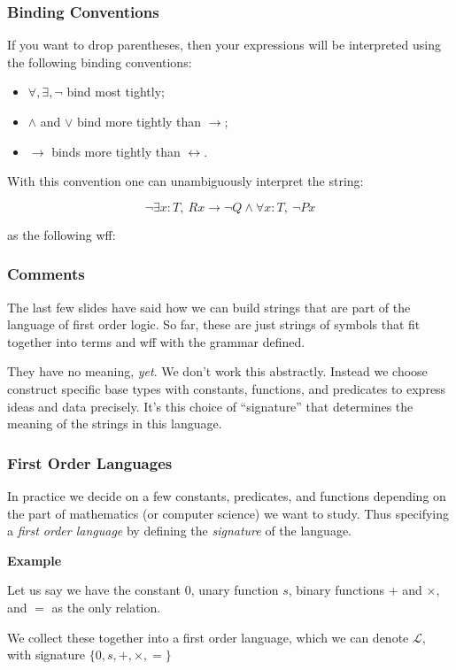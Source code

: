 \documentclass{beamer}
\theoremstyle{indentDefn} \newtheorem{defn}[]{Definition}
\begin{document}
\begin{frame}
	\frametitle{Binding Conventions}
	
	If you want to drop parentheses, then your expressions will be interpreted using the following binding conventions: 
	
	\begin{itemize}
		\item $\forall, \exists, \lnot$ bind most tightly; 
		\item $\land$ and $\lor$ bind more tightly than $\rightarrow$; 
		\item $\rightarrow$ binds more tightly than $\leftrightarrow$. 
	\end{itemize}

	\vspace{0.5cm}

	With this convention one can unambiguously interpret the string:
	
	$$ \lnot \exists x : T, \ Rx \rightarrow \lnot Q \land \forall x : T, \ \lnot Px$$
	
	as the following wff:	
	
	\vfill
	
\end{frame}

\begin{frame}
	\frametitle{Comments}
	
	The last few slides have said how we can build strings that are part of the language of first order logic. So far, these are just strings of symbols that fit together into terms and wff with the grammar defined. 
	
	\vspace{5mm}
	
	They have no meaning, \emph{yet}. We don't work this abstractly. Instead we choose construct specific base types with constants, functions, and predicates to express ideas and data precisely. It's this choice of ``signature'' that determines the meaning of the strings in this language. 
	
\end{frame}

\begin{frame}
	\frametitle{First Order Languages}
	
	In practice we decide on a few constants, predicates, and functions depending on the part of mathematics (or computer science) we want to study. Thus specifying a \emph{first order language} by defining the \emph{signature} of the language.
	
	{\bf Example} 
	
	Let us say we have the constant $0$, unary function $s$, binary functions $+$ and $\times$, and $=$ as the only relation.
	\vspace{0.5cm}	
	
	We collect these together into a first order language, which we can denote $\mathcal{L}$, with signature $\{0,s,+,\times,=\}$
	\vspace{10mm}
	
	
\end{frame}
\end{document}
